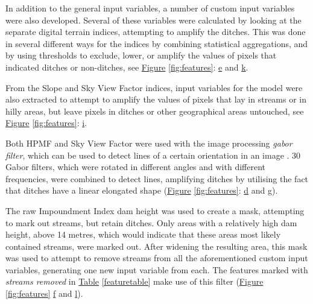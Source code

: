 \documentclass[]{interact}
\theoremstyle{plain}%
\theoremstyle{definition}
\theoremstyle{remark}
\begin{document}
In addition to the general input variables, a number of custom input variables were also developed. Several of these variables were calculated by looking at the separate digital terrain indices, attempting to amplify the ditches. This was done in several different ways for the indices by combining statistical aggregations, and by using thresholds to exclude, lower, or amplify the values of pixels that indicated ditches or non-ditches, see \hyperref[fig:features]{Figure} \ref{fig:features}: \hyperref[fig:features]{e} and \hyperref[fig:features]{k}.

From the Slope and Sky View Factor indices, input variables for the model were also extracted to attempt to amplify the values of pixels that lay in streams or in hilly areas, but leave pixels in ditches or other geographical areas untouched, see \hyperref[fig:features]{Figure} \ref{fig:features}: \hyperref[fig:features]{i}.

\newpage

Both HPMF and Sky View Factor were used with the image processing \textit{gabor filter}, which can be used to detect lines of a certain orientation in an image \citep{gabor}. 30 Gabor filters, which were rotated in different angles and with different frequencies, were combined to detect lines, amplifying ditches by utilising the fact that ditches have a linear elongated shape (\hyperref[fig:features]{Figure} \ref{fig:features}: \hyperref[fig:features]{d} and \hyperref[fig:features]{g}).

\label{impoundmentstreamremoval}
The raw Impoundment Index dam height was used to create a mask, attempting to mark out streams, but retain ditches. Only areas with a relatively high dam height, above 14 metres, which would indicate that these areas most likely contained streams, were marked out. After widening the resulting area, this mask was used to attempt to remove streams from all the aforementioned custom input variables, generating one new input variable from each. The features marked with \textit{streams removed} in \hyperref[featuretable]{Table} \ref{featuretable} make use of this filter (\hyperref[fig:features]{Figure} \ref{fig:features} \hyperref[fig:features]{f} and \hyperref[fig:features]{l}).
\end{document}
